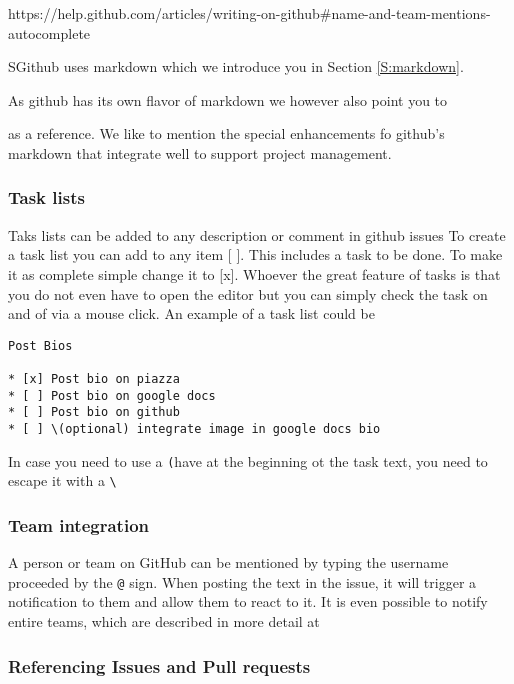 https://help.github.com/articles/writing-on-github#name-and-team-mentions-autocomplete

SGithub uses markdown which we introduce you in Section
  \ref{S:markdown}.

As github has its own flavor of markdown we however also point you to 

as a reference. We like to mention the special enhancements fo github's
markdown that integrate well to
support project management.

\subsubsection{Task lists}

Taks lists can be added to any description or comment in github issues
To create a task list you can add to any item [ ]. This includes a
task to be done. To make it as complete simple change it to
[x]. Whoever the great feature of tasks is that you do not even have
to open the editor but you can simply check the task on and of via a
mouse click. An example of a task list could be 

\begin{lstlisting}
Post Bios

* [x] Post bio on piazza
* [ ] Post bio on google docs
* [ ] Post bio on github
* [ ] \(optional) integrate image in google docs bio
\end{lstlisting}

In case you need to use a \verb|(|have at the beginning ot the task
text, you need to escape it with a \verb|\|

\subsubsection{Team integration}

A person or team on GitHub can be mentioned by typing the username
proceeded by the \verb|@| sign. When posting the text in the issue, it
will trigger a notification to them and allow them to react to it. It
is even possible to notify entire teams, which are described in more
detail at 


\subsubsection{Referencing Issues and Pull requests}

